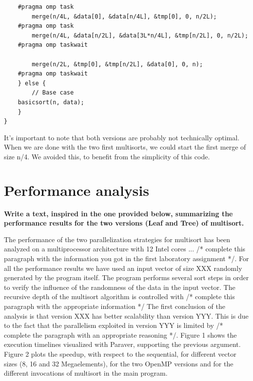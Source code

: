 \documentclass[a4paper,11pt]{article}
\begin{document}
\begin{enumerate}
\begin{verbatim}
	#pragma omp task
        merge(n/4L, &data[0], &data[n/4L], &tmp[0], 0, n/2L);
	#pragma omp task
        merge(n/4L, &data[n/2L], &data[3L*n/4L], &tmp[n/2L], 0, n/2L);
	#pragma omp taskwait

        merge(n/2L, &tmp[0], &tmp[n/2L], &data[0], 0, n);
	#pragma omp taskwait
    } else {
        // Base case
	basicsort(n, data);
    }
}
\end{verbatim}

It's important to note that both versions are probably not technically
optimal.  When we are done with the two first multisorts, we could
start the first merge of size n/4. We avoided this, to benefit from
the simplicity of this code.
\end{enumerate}

\section{Performance analysis}
\textbf{Write a text, inspired in the one provided below, summarizing
  the performance results for the two versions (Leaf and Tree) of
  multisort.}

The performance of the two parallelization strategies for multisort
has been analyzed on a multiprocessor architecture with 12 Intel
cores ... /* complete this paragraph with the information you got in
the first laboratory assignment */.  For all the performance results we
have used an input vector of size XXX randomly generated by the
program itself. The program performs several sort steps in order to
verify the influence of the randomness of the data in the input
vector. The recursive depth of the multisort algorithm is controlled
with /* complete this paragraph with the appropriate information */
The first conclusion of the analysis is that version XXX has better
scalability than version YYY. This is due to the fact that the
parallelism exploited in version YYY is limited by /* complete the
paragraph with an appropriate reasoning */. Figure 1 shows the
execution timelines visualized with Paraver, supporting the previous
argument.  Figure 2 plots the speedup, with respect to the sequential,
for different vector sizes (8, 16 and 32 Megaelements), for the two
OpenMP versions and for the different invocations of multisort in the
main program.
\end{document}
